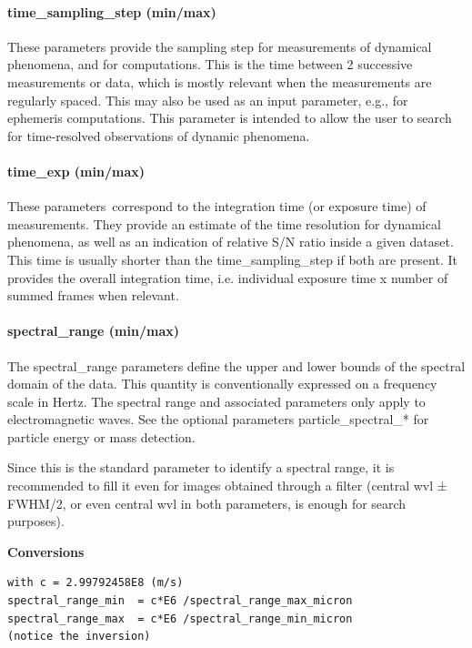 \documentclass[11pt,a4paper]{ivoa}
\begin{document}
\paragraph{time\_sampling\_step (min/max)}

These parameters provide the sampling step for measurements of dynamical phenomena, and for computations. This is the time between 2 successive measurements or data, which is mostly relevant when the measurements are regularly spaced. This may also be used as an input parameter, e.g., for ephemeris computations. This parameter is intended to allow the user to search for time-resolved observations of dynamic phenomena.

\paragraph{time\_exp (min/max)}

These parameters correspond to the integration time (or exposure time) of measurements. They provide an estimate of the time resolution for dynamical phenomena, as well as an indication of relative S/N ratio inside a given dataset. This time is usually shorter than the time\_sampling\_step if both are present. It provides the overall integration time, i.e. individual exposure time x number of summed frames when relevant. 

\paragraph{spectral\_range (min/max)}

The spectral\_range parameters define the upper and lower bounds of the spectral domain of the data. This quantity is conventionally expressed on a frequency scale in Hertz. The spectral range and associated parameters only apply to electromagnetic waves. See the optional parameters particle\_spectral\_* for particle energy or mass detection.

Since this is the standard parameter to identify a spectral range, it is recommended to fill it even for images obtained through a filter (central wvl ± FWHM/2, or even central wvl in both parameters, is enough for search purposes). 





\textbf{Conversions}




\begin{verbatim}
with c = 2.99792458E8 (m/s)
spectral_range_min  = c*E6 /spectral_range_max_micron
spectral_range_max  = c*E6 /spectral_range_min_micron
(notice the inversion)
\end{verbatim}
\end{document}
